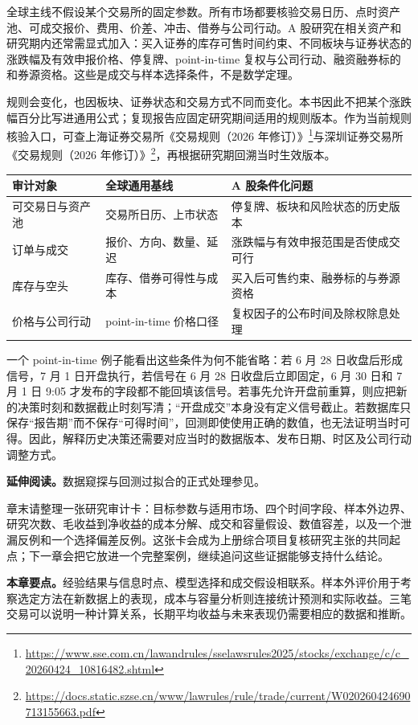 
全球主线不假设某个交易所的固定参数。所有市场都要核验交易日历、点时资产池、可成交报价、费用、价差、冲击、借券与公司行动。A 股研究在相关资产和研究期内还常需显式加入：买入证券的库存可售时间约束、不同板块与证券状态的涨跌幅及有效申报价格、停复牌、point-in-time 复权与公司行动、融资融券标的和券源资格。这些是成交与样本选择条件，不是数学定理。

规则会变化，也因板块、证券状态和交易方式不同而变化。本书因此不把某个涨跌幅百分比写进通用公式；复现报告应固定研究期间适用的规则版本。作为当前规则核验入口，可查上海证券交易所《交易规则（2026 年修订）》\footnote{\url{https://www.sse.com.cn/lawandrules/sselawsrules2025/stocks/exchange/c/c_20260424_10816482.shtml}}与深圳证券交易所《交易规则（2026 年修订）》\footnote{\url{https://docs.static.szse.cn/www/lawrules/rule/trade/current/W020260424690713155663.pdf}}，再根据研究期回溯当时生效版本。

\begin{center}
\begin{tabular}{p{}p{}p{}}
\toprule
审计对象 & 全球通用基线 & A 股条件化问题 \\
\midrule
可交易日与资产池 & 交易所日历、上市状态 & 停复牌、板块和风险状态的历史版本 \\
订单与成交 & 报价、方向、数量、延迟 & 涨跌幅与有效申报范围是否使成交可行 \\
库存与空头 & 库存、借券可得性与成本 & 买入后可售约束、融券标的与券源资格 \\
价格与公司行动 & point-in-time 价格口径 & 复权因子的公布时间及除权除息处理 \\
\bottomrule
\end{tabular}
\end{center}

一个 point-in-time 例子能看出这些条件为何不能省略：若 6 月 28 日收盘后形成信号，7 月 1 日开盘执行，若信号在 6 月 28 日收盘后立即固定，6 月 30 日和 7 月 1 日 9:05 才发布的字段都不能回填该信号。若事先允许开盘前重算，则应把新的决策时刻和数据截止时刻写清；“开盘成交”本身没有定义信号截止。若数据库只保存“报告期”而不保存“可得时间”，回测即使使用正确的数值，也无法证明当时可得。因此，解释历史决策还需要对应当时的数据版本、发布日期、时区及公司行动调整方式。


\noindent\textbf{延伸阅读。}数据窥探与回测过拟合的正式处理参见\cite{white2000reality,bailey2017backtest}。





章末请整理一张研究审计卡：目标参数与适用市场、四个时间字段、样本外边界、研究次数、毛收益到净收益的成本分解、成交和容量假设、数值容差，以及一个泄漏反例和一个选择偏差反例。这张卡会成为上册综合项目复核研究主张的共同起点；下一章会把它放进一个完整案例，继续追问这些证据能够支持什么结论。

\noindent\textbf{本章要点。}经验结果与信息时点、模型选择和成交假设相联系。样本外评价用于考察选定方法在新数据上的表现，成本与容量分析则连接统计预测和实际收益。三笔交易可以说明一种计算关系，长期平均收益与未来表现仍需要相应的数据和推断。